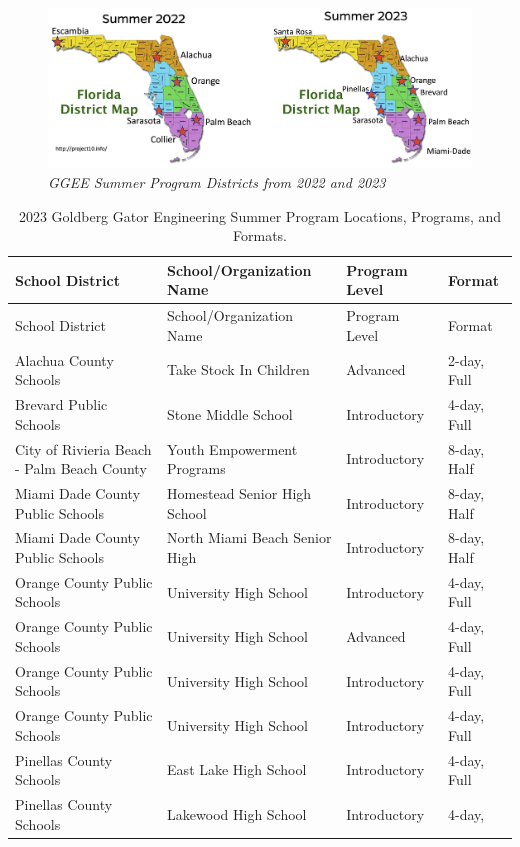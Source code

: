 \documentclass[
]{article}
\begin{document}
\begin{figure}
\centering
\includegraphics{Images/GGEE_23_FL District Map.jpg}
\caption{\emph{GGEE Summer Program Districts from 2022 and 2023}}
\end{figure}

\begin{longtable}[]{@{}llll@{}}
\caption{2023 Goldberg Gator Engineering Summer Program Locations,
Programs, and Formats.}\tabularnewline
\toprule\noalign{}
School District & School/Organization Name & Program Level & Format \\
\midrule\noalign{}
\endfirsthead
\toprule\noalign{}
School District & School/Organization Name & Program Level & Format \\
\midrule\noalign{}
\endhead
\bottomrule\noalign{}
\endlastfoot
Alachua County Schools & Take Stock In Children & Advanced & 2-day,
Full \\
Brevard Public Schools & Stone Middle School & Introductory & 4-day,
Full \\
City of Rivieria Beach - Palm Beach County & Youth Empowerment Programs
& Introductory & 8-day, Half \\
Miami Dade County Public Schools & Homestead Senior High School &
Introductory & 8-day, Half \\
Miami Dade County Public Schools & North Miami Beach Senior High &
Introductory & 8-day, Half \\
Orange County Public Schools & University High School & Introductory &
4-day, Full \\
Orange County Public Schools & University High School & Advanced &
4-day, Full \\
Orange County Public Schools & University High School & Introductory &
4-day, Full \\
Orange County Public Schools & University High School & Introductory &
4-day, Full \\
Pinellas County Schools & East Lake High School & Introductory & 4-day,
Full \\
Pinellas County Schools & Lakewood High School & Introductory & 4-day,

\end{longtable}
\end{document}
